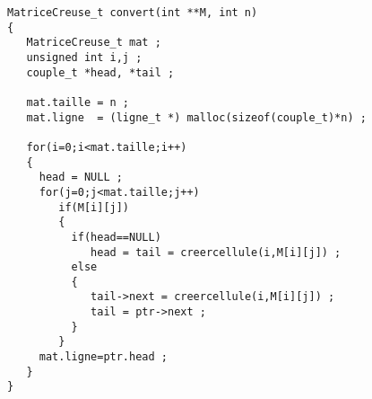 \begin{enumerate}
\begin{verbatim}
MatriceCreuse_t convert(int **M, int n)
{
   MatriceCreuse_t mat ;
   unsigned int i,j ;
   couple_t *head, *tail ;

   mat.taille = n ;
   mat.ligne  = (ligne_t *) malloc(sizeof(couple_t)*n) ;

   for(i=0;i<mat.taille;i++) 
   { 
     head = NULL ;
     for(j=0;j<mat.taille;j++)
        if(M[i][j])
        {
          if(head==NULL)
             head = tail = creercellule(i,M[i][j]) ;
          else 
          {
             tail->next = creercellule(i,M[i][j]) ;
             tail = ptr->next ;
          }
        }
     mat.ligne=ptr.head ;
   }
}
\end{verbatim}
\end{enumerate}
\fi
